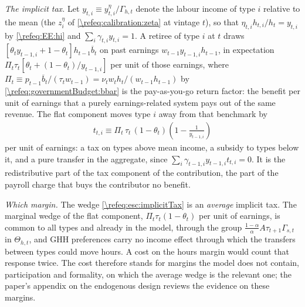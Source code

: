 \emph{The implicit tax.} Let $y_{t,i}\equiv y_{t,i}^{\eta}/\Gamma_{h,t}$ denote the labour income of type $i$ relative to the mean (the $z_i^{\eta}$ of \eqref{\refeq:calibration:zeta} at vintage $t$), so that $\eta_{t,i}h_{t,i}/h_t = y_{t,i}$ by \eqref{\refeq:EE:hi} and $\sum_i\gamma_{t,i}y_{t,i}=1$. A retiree of type $i$ at $t$ draws $\left[\theta_t y_{t-1,i}+1-\theta_t\right]h_{t-1}\overline{b}_t$ on past earnings $w_{t-1}y_{t-1,i}h_{t-1}$, in expectation $\Pi_t\tau_t\left[\theta_t + (1-\theta_t)/y_{t-1,i}\right]$ per unit of those earnings, where $\Pi_t\equiv p_{t-1}\overline{b}_t/(\tau_tw_{t-1}) = \nu_tw_th_t/(w_{t-1}h_{t-1})$ by \eqref{\refeq:governmentBudget:bbar} is the pay-as-you-go return factor: the benefit per unit of earnings that a purely earnings-related system pays out of the same revenue. The flat component moves type $i$ away from that benchmark by
\begin{align}\label{\refeq:esc:implicitTax}
    t_{t,i} \equiv \Pi_t\,\tau_t\,(1-\theta_t)\left(1-\frac{1}{y_{t-1,i}}\right)
\end{align}
per unit of earnings: a tax on types above mean income, a subsidy to types below it, and a pure transfer in the aggregate, since $\sum_i\gamma_{t-1,i}y_{t-1,i}t_{t,i}=0$. It is the redistributive part of the tax component of the contribution, the part of the payroll charge that buys the contributor no benefit.

\emph{Which margin.} The wedge \eqref{\refeq:esc:implicitTax} is an \emph{average} implicit tax. The marginal wedge of the flat component, $\Pi_t\tau_t(1-\theta_t)$ per unit of earnings, is common to all types and already in the model, through the group $\frac{1-\alpha}{\alpha}A\tau_{t+1}\Gamma_{s,t}$ in $\Theta_{h,t}$, and GHH preferences carry no income effect through which the transfers between types could move hours. A cost on the hours margin would count that response twice. The cost therefore stands for margins the model does not contain, participation and formality, on which the average wedge is the relevant one; the paper's appendix on the endogenous design reviews the evidence on these margins.

